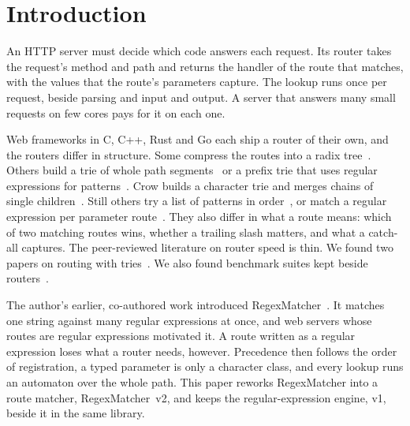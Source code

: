 \section{Introduction}\label{sec:intro}

An HTTP server must decide which code answers each request. Its router takes the request's method
and path and returns the handler of the route that matches, with the values that the route's
parameters capture. The lookup runs once per request, beside parsing and input and output. A
server that answers many small requests on few cores pays for it on each one.

Web frameworks in C, C++, Rust and Go each ship a router of their own, and the routers differ in
structure. Some compress the routes into a radix
tree~\cite{schmidt2019httprouter,gin2026gin,chi2026chi,ahmed2026matchit,viz2025pathtree}. Others
build a trie of whole path segments~\cite{pistache2024pistache,uwebsockets2026uwebsockets,berry2026glaze}
or a prefix trie that uses regular expressions for patterns~\cite{r32026r3}. Crow builds a character
trie and merges chains of single children~\cite{crow2026crow}. Still others try a list of patterns in
order~\cite{oatpp2024oatpp,hirose2026httplib,actix2026router}, or match a regular expression per
parameter route~\cite{drogon2026drogon}. They also differ in what a route means: which of two
matching routes wins, whether a trailing slash matters, and what a catch-all captures. The
peer-reviewed literature on router speed is thin. We found two papers on routing with
tries~\cite{zhang2015urlrouting,dsouza2018htu}. We also found benchmark suites kept beside
routers~\cite{schmidt2020gohttproutingbench,ahmed2026matchit,sworn2026wayfind,vm0012024gateways}.

The author's earlier, co-authored work introduced RegexMatcher~\cite{stankov2024regex}. It matches
one string against many regular expressions at once, and web servers whose routes are regular
expressions motivated it. A route written as a regular expression loses what a router needs,
however. Precedence then follows the order of registration, a typed parameter is only a character
class, and every lookup runs an automaton over the whole path. This paper reworks RegexMatcher into
a route matcher, RegexMatcher~v2, and keeps the regular-expression engine, v1, beside it in the same
library.

